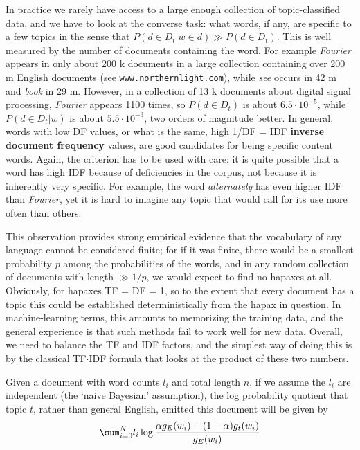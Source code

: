 \smallskip\noindent In practice we rarely have access to a large enough
collection of topic-classified data, and we have to look at the converse task:
what words, if any, are specific to a few topics in the sense that $P(d\in
D_t|w \in d) \gg P(d\in D_t)$. This is well measured by the number of
documents containing the word. For example {\it Fourier} appears in only about
200 k documents in a large collection containing over 200 m English documents
(see {\tt www.northernlight.com}), while {\it see} occurs in 42 m and {\it
  book} in 29 m. However, in a collection of 13 k documents about digital
signal processing, {\it Fourier} appears 1100 times, so $ P(d\in D_t)$ is
about $6.5\cdot 10^{-5}$, while $P(d\in D_t|w)$ is about $5.5 \cdot 10^{-3}$,
two orders of magnitude better. In general, words with low DF values, or what
is the same, high 1/DF = IDF {\bf inverse document frequency}
values, are good candidates for being
specific content words. Again, the criterion has to be used with care: it is
quite possible that a word has high IDF because of deficiencies in the corpus,
not because it is inherently very specific. For example, the word {\it
  alternately} has even higher IDF than {\it Fourier}, yet it is hard to
imagine any topic that would call for its use more often than others.

This observation provides strong empirical evidence that the vocabulary of any
language cannot be considered finite; for if it was finite, there would be a
smallest probability $p$ among the probabilities of the words, and in any
random collection of documents with length $ \gg 1/p$, we would expect to find
no hapaxes at all. Obviously, for hapaxes TF = DF = 1, so to the extent that
every document has a topic this could be established deterministically from
the hapax in question.  In machine-learning terms, this amounts to memorizing
the training data, and the general experience is that such methods fail to
work well for new data.  Overall, we need to balance the TF and IDF factors,
and the simplest way of doing this is by the classical TF$\cdot$IDF formula
that looks at the product of these two numbers.

Given a document with word counts $l_i$ and total length $n$, if we assume the
$l_i$ are independent (the `naive Bayesian' assumption), the log probability
quotient that topic $t$, rather than general English, emitted this document
will be given by $$\sum_{i=0}^N l_i \log {{\alpha g_E(w_i) + (1-\alpha
    )g_t(w_i)}\over{g_E(w_i)}}$$

